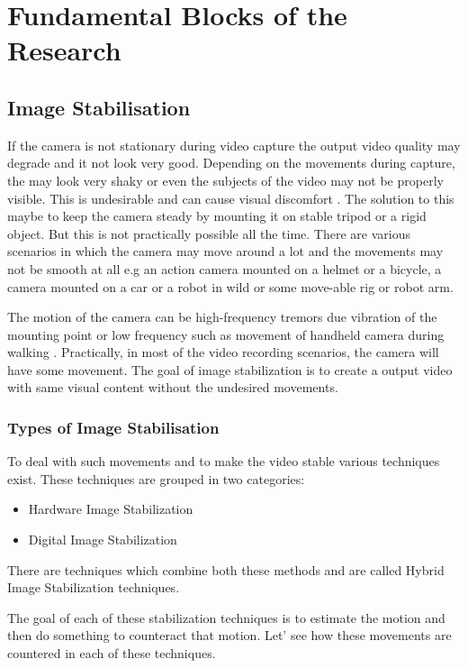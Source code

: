 \chapter{Fundamental Blocks of the Research} \label{chapter_two}


\section{Image Stabilisation}
If the camera is not stationary during video capture the output video quality may degrade and it not look very good. Depending on the movements during capture, the may look very shaky or even the subjects of the video may not be properly visible. This is undesirable and can cause visual discomfort \citep{jia2012probabilistic}. The solution to this maybe to keep the camera steady by mounting it on stable tripod or a rigid object. But this is not practically possible all the time. There are various scenarios in which the camera may move around a lot and the movements may not be smooth at all e.g an action camera mounted on a helmet or a bicycle, a camera mounted on a car or a robot in wild or some move-able rig or robot arm. 

The motion of the camera can be high-frequency tremors due vibration of the mounting point or low frequency such as movement of handheld camera during walking \citep{dis_review}. Practically, in most of the video recording scenarios, the camera will have some movement. The goal of image stabilization is to create a output video with same visual content without the undesired movements. 

\subsection{Types of Image Stabilisation}
To deal with such movements and to make the video stable various techniques exist. These techniques are grouped in two categories:

\begin{itemize}
\item Hardware Image Stabilization
\item Digital Image Stabilization  
\end{itemize}
There are techniques which combine both these methods and are called Hybrid Image Stabilization techniques.

The goal of each of these stabilization techniques is to estimate the motion and then do something to counteract that motion. Let' see how these movements are countered in each of these techniques.

